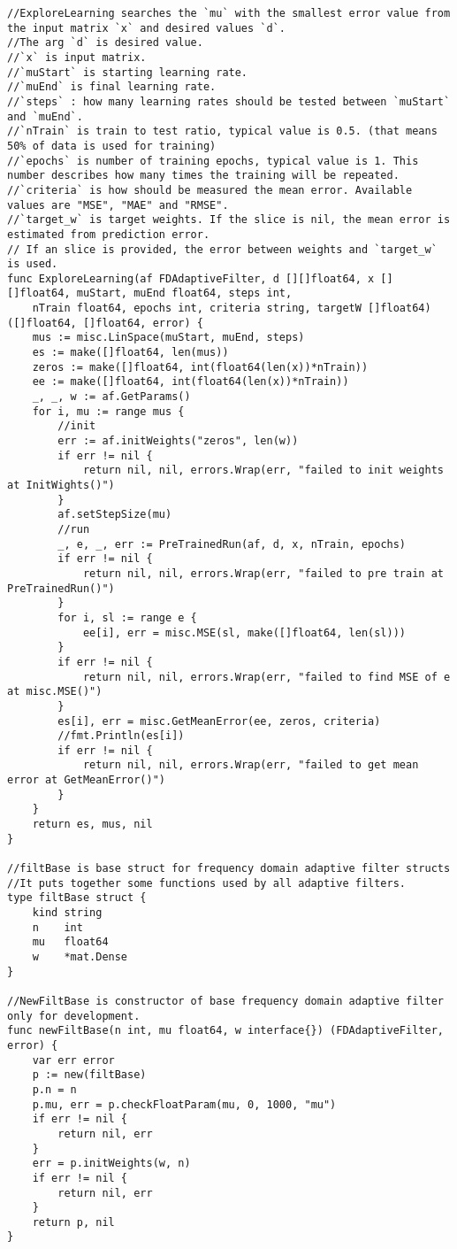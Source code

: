 \begin{lstlisting}[caption=fdadf/base.go,label=fdadf/base.go]
//ExploreLearning searches the `mu` with the smallest error value from the input matrix `x` and desired values `d`.
//The arg `d` is desired value.
//`x` is input matrix.
//`muStart` is starting learning rate.
//`muEnd` is final learning rate.
//`steps` : how many learning rates should be tested between `muStart` and `muEnd`.
//`nTrain` is train to test ratio, typical value is 0.5. (that means 50% of data is used for training)
//`epochs` is number of training epochs, typical value is 1. This number describes how many times the training will be repeated.
//`criteria` is how should be measured the mean error. Available values are "MSE", "MAE" and "RMSE".
//`target_w` is target weights. If the slice is nil, the mean error is estimated from prediction error.
// If an slice is provided, the error between weights and `target_w` is used.
func ExploreLearning(af FDAdaptiveFilter, d [][]float64, x [][]float64, muStart, muEnd float64, steps int,
    nTrain float64, epochs int, criteria string, targetW []float64) ([]float64, []float64, error) {
    mus := misc.LinSpace(muStart, muEnd, steps)
    es := make([]float64, len(mus))
    zeros := make([]float64, int(float64(len(x))*nTrain))
    ee := make([]float64, int(float64(len(x))*nTrain))
    _, _, w := af.GetParams()
    for i, mu := range mus {
        //init
        err := af.initWeights("zeros", len(w))
        if err != nil {
            return nil, nil, errors.Wrap(err, "failed to init weights at InitWights()")
        }
        af.setStepSize(mu)
        //run
        _, e, _, err := PreTrainedRun(af, d, x, nTrain, epochs)
        if err != nil {
            return nil, nil, errors.Wrap(err, "failed to pre train at PreTrainedRun()")
        }
        for i, sl := range e {
            ee[i], err = misc.MSE(sl, make([]float64, len(sl)))
        }
        if err != nil {
            return nil, nil, errors.Wrap(err, "failed to find MSE of e at misc.MSE()")
        }
        es[i], err = misc.GetMeanError(ee, zeros, criteria)
        //fmt.Println(es[i])
        if err != nil {
            return nil, nil, errors.Wrap(err, "failed to get mean error at GetMeanError()")
        }
    }
    return es, mus, nil
}

//filtBase is base struct for frequency domain adaptive filter structs
//It puts together some functions used by all adaptive filters.
type filtBase struct {
    kind string
    n    int
    mu   float64
    w    *mat.Dense
}

//NewFiltBase is constructor of base frequency domain adaptive filter only for development.
func newFiltBase(n int, mu float64, w interface{}) (FDAdaptiveFilter, error) {
    var err error
    p := new(filtBase)
    p.n = n
    p.mu, err = p.checkFloatParam(mu, 0, 1000, "mu")
    if err != nil {
        return nil, err
    }
    err = p.initWeights(w, n)
    if err != nil {
        return nil, err
    }
    return p, nil
}


\end{lstlisting}
